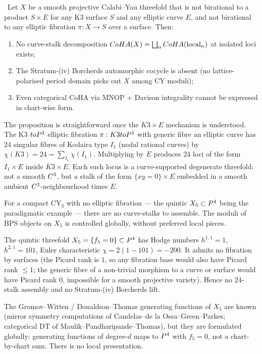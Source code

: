 \begin{proposition}
\label{prop:no-fibration-assembly}
\ClaimStatusProposition\
Let $X$ be a smooth projective Calabi--Yau threefold that is not
birational to a product $S \times E$ for any K3 surface $S$ and any
elliptic curve $E$, and not birational to any elliptic fibration
$\pi: X \to S$ over a surface. Then:
\begin{enumerate}[leftmargin=2em]
\item No curve-stalk decomposition $CoHA(X) = \bigsqcup_\alpha
  CoHA(\text{local}_\alpha)$ at isolated loci exists;
\item The Stratum-(iv) Borcherds automorphic cocycle is absent (no
  lattice-polarised period domain picks out $X$ among CY moduli);
\item Even categorical CoHA via MNOP + Davison integrality cannot be
  expressed in chart-wise form.
\end{enumerate}
\end{proposition}

The proposition is straightforward once the $K3 \times E$ mechanism is
understood. The K3 $to P^1$ elliptic fibration
$\pi: K3 to P^1$ with generic fibre an elliptic curve has $24$
singular fibres of Kodaira type $I_1$ (nodal rational curves) by
$\chi(K3) = 24 = \sum_{I_1} \chi(I_1)$. Multiplying by $E$ produces
$24$ loci of the form $I_1 \times E$ inside $K3 \times E$. Each such
locus is a curve-supported degenerate threefold: not a smooth $C^3$,
but a stalk of the form $\{xy = 0\} \times E$ embedded in a smooth
ambient $C^3$-neighbourhood times $E$.

For a compact CY$_3$ with no elliptic fibration --- the quintic $X_5
\subset P^4$ being the paradigmatic example --- there are no
curve-stalks to assemble. The moduli of BPS objects on $X_5$ is controlled
globally, without preferred local pieces.

\begin{example}
\label{ex:quintic}
The quintic threefold $X_5 = \{f_5 = 0\} \subset P^4$ has Hodge numbers
$h^{1,1} = 1$, $h^{2,1} = 101$, Euler characteristic $\chi = 2(1 - 101)
= -200$. It admits no fibration by surfaces (the Picard rank is $1$, so
any fibration base would also have Picard rank $\leq 1$; the generic
fibre of a non-trivial morphism to a curve or surface would have Picard
rank $0$, impossible for a smooth projective variety). Hence no
$24$-stalk assembly and no Stratum-(iv) Borcherds lift.

The Gromov--Witten / Donaldson--Thomas generating functions of $X_5$
are known (mirror symmetry computations of Candelas--de la Ossa--Green--Parkes;
categorical DT of Maulik--Pandharipande--Thomas), but they are
formulated globally: generating functions of degree-$d$ maps to $P^4$
with $f_5 = 0$, not a chart-by-chart sum. There is no local presentation.
\end{example}

